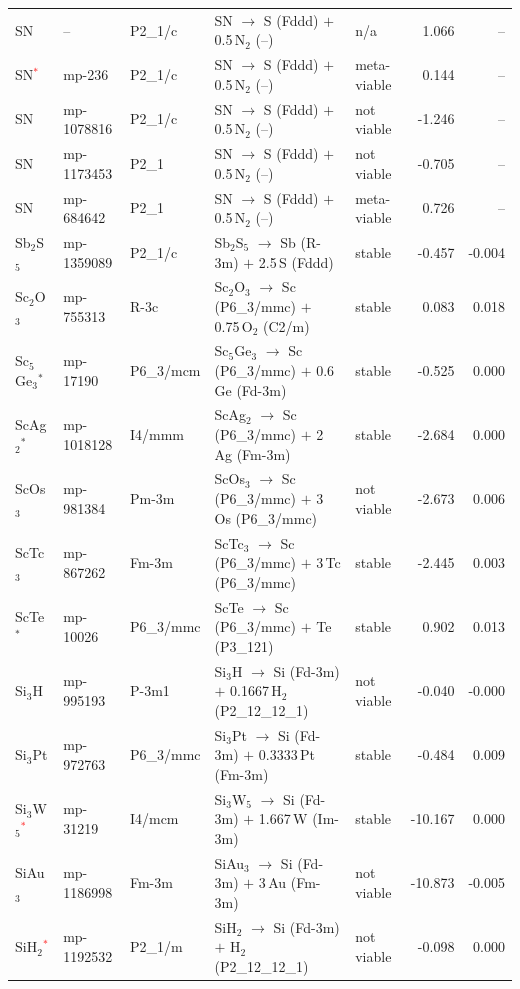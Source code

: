\begin{longtable}{@{}ll l@{\hspace{4pt}} p{4.6cm} l@{\hspace{4pt}} rr@{}}
SN & -- & P2\_1/c & SN $\to$ S (Fddd) $+$ 0.5\,N$_{2}$ (--) & n/a & 1.066 & -- \\
SN\textcolor{red}{$^*$} & mp-236 & P2\_1/c & SN $\to$ S (Fddd) $+$ 0.5\,N$_{2}$ (--) & meta-viable & 0.144 & -- \\
SN & mp-1078816 & P2\_1/c & SN $\to$ S (Fddd) $+$ 0.5\,N$_{2}$ (--) & not viable & -1.246 & -- \\
SN & mp-1173453 & P2\_1 & SN $\to$ S (Fddd) $+$ 0.5\,N$_{2}$ (--) & not viable & -0.705 & -- \\
SN & mp-684642 & P2\_1 & SN $\to$ S (Fddd) $+$ 0.5\,N$_{2}$ (--) & meta-viable & 0.726 & -- \\
Sb$_{2}$S$_{5}$ & mp-1359089 & P2\_1/c & Sb$_{2}$S$_{5}$ $\to$ Sb (R-3m) $+$ 2.5\,S (Fddd) & stable & -0.457 & -0.004 \\
Sc$_{2}$O$_{3}$ & mp-755313 & R-3c & Sc$_{2}$O$_{3}$ $\to$ Sc (P6\_3/mmc) $+$ 0.75\,O$_{2}$ (C2/m) & stable & 0.083 & 0.018 \\
Sc$_{5}$Ge$_{3}$$^*$ & mp-17190 & P6\_3/mcm & Sc$_{5}$Ge$_{3}$ $\to$ Sc (P6\_3/mmc) $+$ 0.6\,Ge (Fd-3m) & stable & -0.525 & 0.000 \\
ScAg$_{2}$$^*$ & mp-1018128 & I4/mmm & ScAg$_{2}$ $\to$ Sc (P6\_3/mmc) $+$ 2\,Ag (Fm-3m) & stable & -2.684 & 0.000 \\
ScOs$_{3}$ & mp-981384 & Pm-3m & ScOs$_{3}$ $\to$ Sc (P6\_3/mmc) $+$ 3\,Os (P6\_3/mmc) & not viable & -2.673 & 0.006 \\
ScTc$_{3}$ & mp-867262 & Fm-3m & ScTc$_{3}$ $\to$ Sc (P6\_3/mmc) $+$ 3\,Tc (P6\_3/mmc) & stable & -2.445 & 0.003 \\
ScTe$^*$ & mp-10026 & P6\_3/mmc & ScTe $\to$ Sc (P6\_3/mmc) $+$ Te (P3\_121) & stable & 0.902 & 0.013 \\
Si$_{3}$H & mp-995193 & P-3m1 & Si$_{3}$H $\to$ Si (Fd-3m) $+$ 0.1667\,H$_{2}$ (P2\_12\_12\_1) & not viable & -0.040 & -0.000 \\
Si$_{3}$Pt & mp-972763 & P6\_3/mmc & Si$_{3}$Pt $\to$ Si (Fd-3m) $+$ 0.3333\,Pt (Fm-3m) & stable & -0.484 & 0.009 \\
Si$_{3}$W$_{5}$\textcolor{red}{$^*$} & mp-31219 & I4/mcm & Si$_{3}$W$_{5}$ $\to$ Si (Fd-3m) $+$ 1.667\,W (Im-3m) & stable & -10.167 & 0.000 \\
SiAu$_{3}$ & mp-1186998 & Fm-3m & SiAu$_{3}$ $\to$ Si (Fd-3m) $+$ 3\,Au (Fm-3m) & not viable & -10.873 & -0.005 \\
SiH$_{2}$\textcolor{red}{$^*$} & mp-1192532 & P2\_1/m & SiH$_{2}$ $\to$ Si (Fd-3m) $+$ H$_{2}$ (P2\_12\_12\_1) & not viable & -0.098 & 0.000 \\

\end{longtable}
